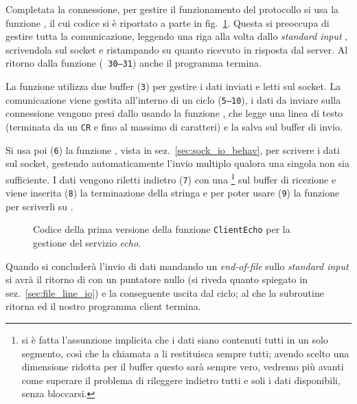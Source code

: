 Completata la connessione, per gestire il funzionamento del protocollo si usa
la funzione , il cui codice si è riportato a parte in
fig.~\ref{fig:TCP_client_echo_sub}. Questa si preoccupa di gestire tutta la
comunicazione, leggendo una riga alla volta dallo \textit{standard input}
, scrivendola sul socket e ristampando su  quanto
ricevuto in risposta dal server. Al ritorno dalla funzione (\texttt{\small
  30--31}) anche il programma termina.

La funzione  utilizza due buffer (\texttt{\small 3}) per
gestire i dati inviati e letti sul socket.  La comunicazione viene gestita
all'interno di un ciclo (\texttt{\small 5--10}), i dati da inviare sulla
connessione vengono presi dallo  usando la funzione ,
che legge una linea di testo (terminata da un \texttt{CR} e fino al massimo di
 caratteri) e la salva sul buffer di invio.

Si usa poi (\texttt{\small 6}) la funzione , vista in
sez.~\ref{sec:sock_io_behav}, per scrivere i dati sul socket, gestendo
automaticamente l'invio multiplo qualora una singola  non sia
sufficiente.  I dati vengono riletti indietro (\texttt{\small 7}) con una
\footnote{si è fatta l'assunzione implicita che i dati siano
  contenuti tutti in un solo segmento, così che la chiamata a  li
  restituisca sempre tutti; avendo scelto una dimensione ridotta per il buffer
  questo sarà sempre vero, vedremo più avanti come superare il problema di
  rileggere indietro tutti e soli i dati disponibili, senza bloccarsi.} sul
buffer di ricezione e viene inserita (\texttt{\small 8}) la terminazione della
stringa e per poter usare (\texttt{\small 9}) la funzione  per
scriverli su .

\begin{figure}[!htbp]
  \footnotesize \centering
  \begin{minipage}[c]{\codesamplewidth}
  \end{minipage} 
  \normalsize
  \caption{Codice della prima versione della funzione \texttt{ClientEcho} per 
    la gestione del servizio \textit{echo}.}
  \label{fig:TCP_client_echo_sub}
\end{figure}

Quando si concluderà l'invio di dati mandando un \textit{end-of-file} sullo
\textit{standard input} si avrà il ritorno di  con un puntatore
nullo (si riveda quanto spiegato in sez.~\ref{sec:file_line_io}) e la
conseguente uscita dal ciclo; al che la subroutine ritorna ed il nostro
programma client termina.

